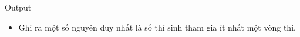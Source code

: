 Output
\begin{itemize}
	\item Ghi ra một số nguyên duy nhất là số thí sinh tham gia ít nhất một vòng thi.
\end{itemize}